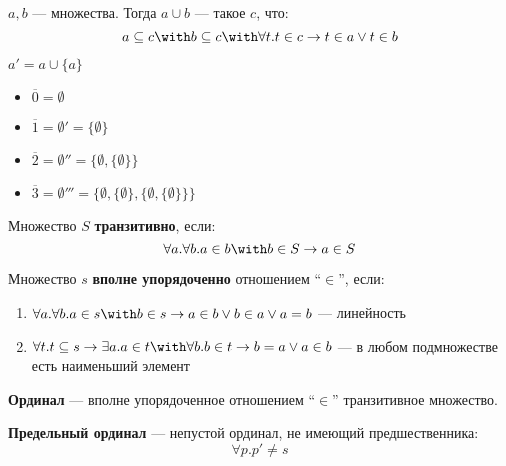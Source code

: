 \begin{obozn}
    \(a, b\) --- множества. Тогда \(a \cup b\) --- такое \(c\), что:
    \[a \subseteq c \with b \subseteq c \with \forall t.t \in c \to t \in a \lor t \in b\]
\end{obozn}

\begin{definition}
    \(a' = a \cup \{a\}\)
\end{definition}

\begin{obozn}\itemfix
    \begin{itemize}
        \item \(\overline 0 = \emptyset\)
        \item \(\overline 1 = \emptyset' = \{\emptyset\}\)
        \item \(\overline 2 = \emptyset'' = \{\emptyset, \{\emptyset\}\}\)
        \item \(\overline 3 = \emptyset''' = \{\emptyset, \{\emptyset\}, \{\emptyset, \{\emptyset\}\}\}\)
    \end{itemize}
\end{obozn}

\begin{definition}
    Множество \(S\) \textbf{транзитивно}, если:
    \[\forall a.\forall b.a \in b \with b \in S \to a \in S\]
\end{definition}

\begin{definition}
    Множество \(s\) \textbf{вполне упорядоченно} отношением ``\(\in\)'', если:
    \begin{enumerate}
        \item \(\forall a.\forall b.a \in s \with b \in s \to a \in b \lor b \in a \lor a = b\) --- линейность
        \item \(\forall t.t \subseteq s \to \exists a. a \in t \with \forall b.b \in t \to b = a \lor a \in b\) --- в любом подмножестве есть наименьший элемент
    \end{enumerate}
\end{definition}

\begin{definition}
    \textbf{Ординал} --- вполне упорядоченное отношением ``\(\in\)'' транзитивное множество.
\end{definition}

\begin{definition}
    \textbf{Предельный ординал} --- непустой ординал, не имеющий предшественника:
    \[\forall p.p' \neq s\]
\end{definition}

